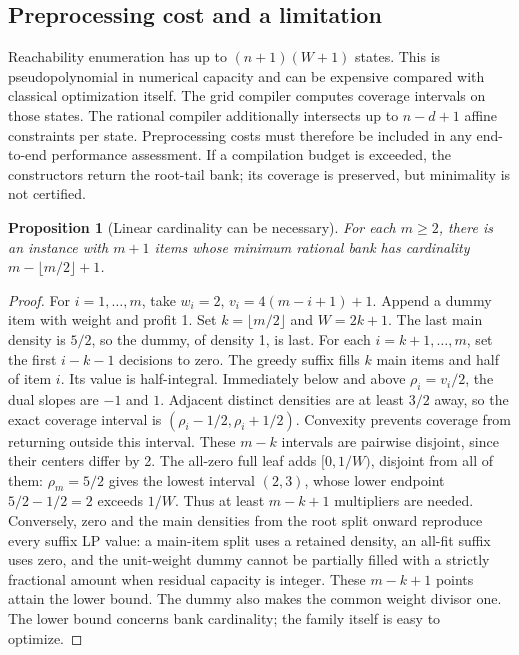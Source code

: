\documentclass[referee,pdflatex,sn-mathphys-num]{sn-jnl}
\theoremstyle{thmstyleone}
\newtheorem{proposition}[theorem]{Proposition}
\theoremstyle{thmstyletwo}
\begin{document}
\subsection{Preprocessing cost and a limitation}
Reachability enumeration has up to $(n+1)(W+1)$ states. This is pseudopolynomial in numerical capacity and can be expensive compared with classical optimization itself. The grid compiler computes coverage intervals on those states. The rational compiler additionally intersects up to $n-d+1$ affine constraints per state. Preprocessing costs must therefore be included in any end-to-end performance assessment. If a compilation budget is exceeded, the constructors return the root-tail bank; its coverage is preserved, but minimality is not certified.

\begin{proposition}[Linear cardinality can be necessary]\label{prop:barrier}
For each $m\geq2$, there is an instance with $m+1$ items whose minimum rational bank has cardinality $m-\lfloor m/2\rfloor+1$.
\end{proposition}
\begin{proof}
For $i=1,\ldots,m$, take $w_i=2$, $v_i=4(m-i+1)+1$. Append a dummy item with weight and profit 1. Set $k=\lfloor m/2\rfloor$ and $W=2k+1$. The last main density is $5/2$, so the dummy, of density 1, is last. For each $i=k+1,\ldots,m$, set the first $i-k-1$ decisions to zero. The greedy suffix fills $k$ main items and half of item $i$. Its value is half-integral. Immediately below and above $\rho_i=v_i/2$, the dual slopes are $-1$ and $1$. Adjacent distinct densities are at least $3/2$ away, so the exact coverage interval is $(\rho_i-1/2,\rho_i+1/2)$. Convexity prevents coverage from returning outside this interval. These $m-k$ intervals are pairwise disjoint, since their centers differ by 2. The all-zero full leaf adds $[0,1/W)$, disjoint from all of them: $\rho_m=5/2$ gives the lowest interval $(2,3)$, whose lower endpoint $5/2-1/2=2$ exceeds $1/W$. Thus at least $m-k+1$ multipliers are needed. Conversely, zero and the main densities from the root split onward reproduce every suffix LP value: a main-item split uses a retained density, an all-fit suffix uses zero, and the unit-weight dummy cannot be partially filled with a strictly fractional amount when residual capacity is integer. These $m-k+1$ points attain the lower bound. The dummy also makes the common weight divisor one. The lower bound concerns bank cardinality; the family itself is easy to optimize.
\end{proof}
\end{document}

